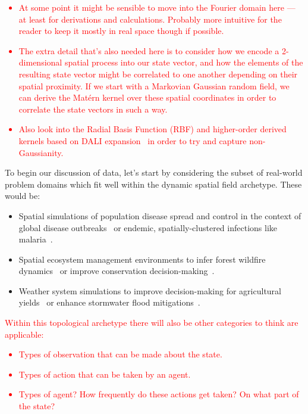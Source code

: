 \textcolor{red}{
\begin{itemize}
\item{At some point it might be sensible to move into the Fourier domain here --- at least for derivations and calculations. Probably more intuitive for the reader to keep it mostly in real space though if possible.} 
\item{The extra detail that's also needed here is to consider how we encode a 2-dimensional spatial process into our state vector, and how the elements of the resulting state vector might be correlated to one another depending on their spatial proximity. If we start with a Markovian Gaussian random field, we can derive the Mat\'{e}rn kernel over these spatial coordinates in order to correlate the state vectors in such a way.} 
\item{Also look into the Radial Basis Function (RBF) and higher-order derived kernels based on DALI expansion~\cite{sellentin2014breaking} in order to try and capture non-Gaussianity.}
\end{itemize}
}

To begin our discussion of data, let's start by considering the subset of real-world problem domains which fit well within the dynamic spatial field archetype. These would be:
\begin{itemize}
\item{Spatial simulations of population disease spread and control in the context of global disease outbreaks~\cite{ohi2020exploring} or endemic, spatially-clustered infections like malaria~\cite{carter2000spatial}.}
\item{Spatial ecosystem management environments to infer forest wildfire dynamics~\cite{ganapathi2018using} or improve conservation decision-making~\cite{lapeyrolerie2022deep}.}
\item{Weather system simulations to improve decision-making for agricultural yields~\cite{chen2021reinforcement} or enhance stormwater flood mitigations~\cite{saliba2020deep}.}
\end{itemize}

\textcolor{red}{Within this topological archetype there will also be other categories to think are applicable:
\begin{itemize}
\item{Types of observation that can be made about the state.}
\item{Types of action that can be taken by an agent.}
\item{Types of agent? How frequently do these actions get taken? On what part of the state?}
\end{itemize}
}

